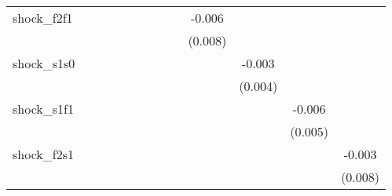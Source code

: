 {\begin{tabular}{l*{12}{c}}
\addlinespace
shock\_f2f1  &                     &                     &                     &                     &                     &                     &                     &                     &      -0.006         &                     &                     &                     \\
            &                     &                     &                     &                     &                     &                     &                     &                     &     (0.008)         &                     &                     &                     \\
\addlinespace
shock\_s1s0  &                     &                     &                     &                     &                     &                     &                     &                     &                     &      -0.003         &                     &                     \\
            &                     &                     &                     &                     &                     &                     &                     &                     &                     &     (0.004)         &                     &                     \\
\addlinespace
shock\_s1f1  &                     &                     &                     &                     &                     &                     &                     &                     &                     &                     &      -0.006         &                     \\
            &                     &                     &                     &                     &                     &                     &                     &                     &                     &                     &     (0.005)         &                     \\
\addlinespace
shock\_f2s1  &                     &                     &                     &                     &                     &                     &                     &                     &                     &                     &                     &      -0.003         \\
            &                     &                     &                     &                     &                     &                     &                     &                     &                     &                     &                     &     (0.008)         \\

\end{tabular}}
